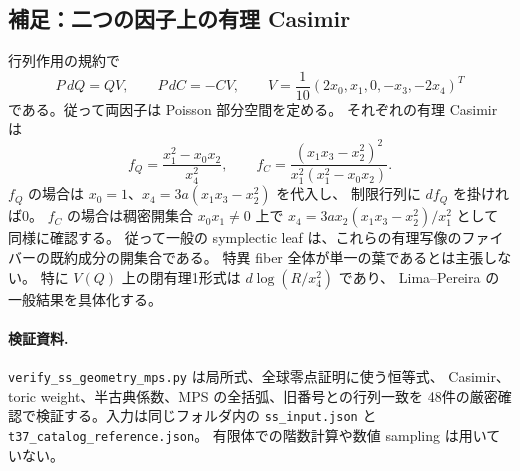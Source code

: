 \subsection{補足：二つの因子上の有理 Casimir}

行列作用の規約で
\[
 P\,dQ=QV,\qquad P\,dC=-CV,\qquad
 V=\frac1{10}(2x_0,x_1,0,-x_3,-2x_4)^T
\]
である。従って両因子は Poisson 部分空間を定める。
それぞれの有理 Casimir は
\[
 f_Q=\frac{x_1^2-x_0x_2}{x_4^2},\qquad
 f_C=\frac{(x_1x_3-x_2^2)^2}{x_1^2(x_1^2-x_0x_2)}.
\]
$f_Q$ の場合は $x_0=1$、$x_4=3a(x_1x_3-x_2^2)$ を代入し、
制限行列に $df_Q$ を掛ければ0。
$f_C$ の場合は稠密開集合 $x_0x_1\ne0$ 上で
$x_4=3ax_2(x_1x_3-x_2^2)/x_1^2$ として同様に確認する。
従って一般の symplectic leaf は、これらの有理写像のファイバーの既約成分の開集合である。
特異 fiber 全体が単一の葉であるとは主張しない。
特に $V(Q)$ 上の閉有理1形式は $d\log(R/x_4^2)$ であり、
Lima--Pereira の一般結果\cite[Theorem 3.3]{LP}を具体化する。

\paragraph{検証資料.}
\texttt{verify\_ss\_geometry\_mps.py} は局所式、全球零点証明に使う恒等式、
Casimir、toric weight、半古典係数、MPS の全括弧、旧番号との行列一致を
48件の厳密確認で検証する。入力は同じフォルダ内の
\texttt{ss\_input.json} と \texttt{t37\_catalog\_reference.json}。
有限体での階数計算や数値 sampling は用いていない。

